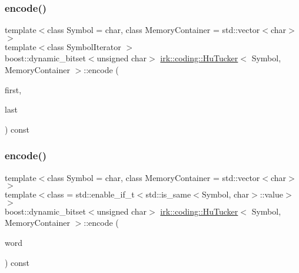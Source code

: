 \mbox{\label{classirk_1_1coding_1_1HuTucker_a311952f32224b56268f7d9a76e9819ec}} 
\subsubsection{\texorpdfstring{encode()}{encode()}\hspace{0.1cm}{\footnotesize\ttfamily [1/3]}}
{\footnotesize\ttfamily template$<$class Symbol  = char, class Memory\+Container  = std\+::vector$<$char$>$$>$ \\
template$<$class Symbol\+Iterator $>$ \\
boost\+::dynamic\+\_\+bitset$<$unsigned char$>$ \mbox{\hyperlink{classirk_1_1coding_1_1HuTucker}{irk\+::coding\+::\+Hu\+Tucker}}$<$ Symbol, Memory\+Container $>$\+::encode (\begin{DoxyParamCaption}\item[{Symbol\+Iterator}]{first,  }\item[{Symbol\+Iterator}]{last }\end{DoxyParamCaption}) const\hspace{0.3cm}{\ttfamily [inline]}}

\mbox{\label{classirk_1_1coding_1_1HuTucker_ad3706b7ab4c8a440e21998f5996c38bb}} 
\subsubsection{\texorpdfstring{encode()}{encode()}\hspace{0.1cm}{\footnotesize\ttfamily [2/3]}}
{\footnotesize\ttfamily template$<$class Symbol  = char, class Memory\+Container  = std\+::vector$<$char$>$$>$ \\
template$<$class  = std\+::enable\+\_\+if\+\_\+t$<$std\+::is\+\_\+same$<$\+Symbol, char$>$\+::value$>$$>$ \\
boost\+::dynamic\+\_\+bitset$<$unsigned char$>$ \mbox{\hyperlink{classirk_1_1coding_1_1HuTucker}{irk\+::coding\+::\+Hu\+Tucker}}$<$ Symbol, Memory\+Container $>$\+::encode (\begin{DoxyParamCaption}\item[{const std\+::string \&}]{word }\end{DoxyParamCaption}) const\hspace{0.3cm}{\ttfamily [inline]}}

